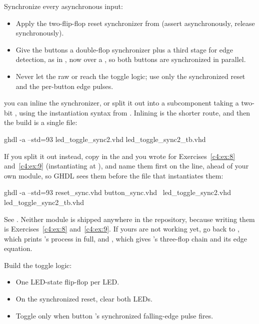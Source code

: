 \begin{parts}
  \item Synchronize every asynchronous input:
    \begin{itemize}
      \item Apply the two-flip-flop reset synchronizer from  (assert asynchronously,
        release synchronously).
      \item Give the buttons a double-flop synchronizer plus a third stage for edge detection, as
        in , now over a , so both buttons are
        synchronized in parallel.
      \item Never let the raw  or  reach the toggle logic; use only
        the synchronized reset and the per-button edge pulses.
    \end{itemize}
    \note[Tip] you can inline the synchronizer, or split it out into a subcomponent taking a two-bit
    , using the instantiation syntax from . Inlining is the shorter
    route, and then the build is a single file:
\begin{shell}
ghdl -a --std=93 led_toggle_sync2.vhd led_toggle_sync2_tb.vhd
\end{shell}
    If you split it out instead, copy in the  and  you
    wrote for Exercises~\ref{c4:ex:8} and~\ref{c4:ex:9} (instantiating  at
    ), and name them first on the  line, ahead of your own module, so
    GHDL sees them before the file that instantiates them:
\begin{shell}
ghdl -a --std=93 reset_sync.vhd button_sync.vhd \
                 led_toggle_sync2.vhd led_toggle_sync2_tb.vhd
\end{shell}
    See . Neither module is shipped anywhere in the repository, because writing them
    is Exercises~\ref{c4:ex:8} and~\ref{c4:ex:9}. If yours are not working yet, go back to
    \secref{c4:a5}, which prints \code{reset_sync}'s process in full, and \secref{c4:a6}, which
    gives \code{button_sync}'s three-flop chain and its edge equation.
  \item Build the toggle logic:
    \begin{itemize}
      \item One LED-state flip-flop per LED.
      \item On the synchronized reset, clear both LEDs.
      \item Toggle  only when button 's synchronized falling-edge pulse fires.

\end{itemize}
\end{parts}
